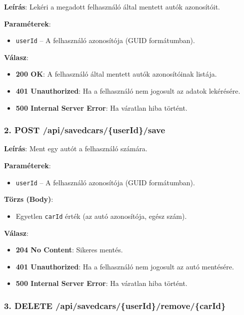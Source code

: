 \documentclass{report}[11pt]
\begin{document}
\textbf{Leírás}:  
Lekéri a megadott felhasználó által mentett autók azonosítóit.

\textbf{Paraméterek}:  
\begin{itemize}
    \item \texttt{userId} – A felhasználó azonosítója (GUID formátumban).
\end{itemize}

\textbf{Válasz}:  
\begin{itemize}
    \item \textbf{200 OK}: A felhasználó által mentett autók azonosítóinak listája.
    \item \textbf{401 Unauthorized}: Ha a felhasználó nem jogosult az adatok lekérésére.
    \item \textbf{500 Internal Server Error}: Ha váratlan hiba történt.
\end{itemize}

\subsubsection{2. POST /api/savedcars/\{userId\}/save}

\textbf{Leírás}:  
Ment egy autót a felhasználó számára.

\textbf{Paraméterek}:  
\begin{itemize}
    \item \texttt{userId} – A felhasználó azonosítója (GUID formátumban).
\end{itemize}

\textbf{Törzs (Body)}:  
\begin{itemize}
    \item Egyetlen \texttt{carId} érték (az autó azonosítója, egész szám).
\end{itemize}

\textbf{Válasz}:  
\begin{itemize}
    \item \textbf{204 No Content}: Sikeres mentés.
    \item \textbf{401 Unauthorized}: Ha a felhasználó nem jogosult az autó mentésére.
    \item \textbf{500 Internal Server Error}: Ha váratlan hiba történt.
\end{itemize}

\subsubsection{3. DELETE /api/savedcars/\{userId\}/remove/\{carId\}}
\end{document}
